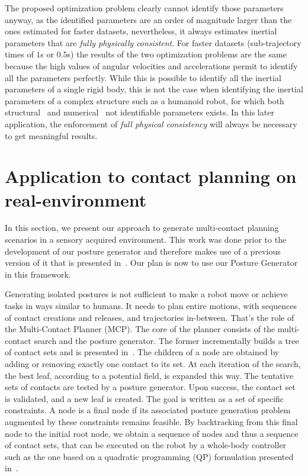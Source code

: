\FloatBarrier
The proposed optimization problem clearly cannot identify those parameters anyway, as the identified parameters are an order of magnitude larger than the ones estimated for faster datasets, nevertheless, it always estimates inertial parameters that are \emph{fully physically consistent}.
For faster datasets (sub-trajectory times of $1$s or $0.5$s) the results of the two optimization problems are the same because the high values of angular velocities and accelerations permit to identify all the parameters perfectly.
While this is possible to identify all the inertial parameters of a single rigid body, this is not the case when identifying the inertial parameters of a complex structure such as a humanoid robot, for which both structural~\cite{ayusawa2014identifiability} and numerical~\cite{pham1991essential} not identifiable parameters exists. In this later application, the enforcement of \emph{full physical consistency}  will always be necessary to get meaningful results.

\section{Application to contact planning on real-environment}
\label{sec:application_of_contact_planning_on_real_environment}

In this section, we present our approach to generate multi-contact planning scenarios in a sensory acquired environment.
This work was done prior to the development of our posture generator and therefore makes use of a previous version of it that is presented in~\cite{bouyarmane:humanoids:2010}.
Our plan is now to use our Posture Generator in this framework.

Generating isolated postures is not sufficient to make a robot move or achieve tasks in ways similar to humans.
It needs to plan entire motions, with sequences of contact creations and releases, and trajectories in-between.
That's the role of the Multi-Contact Planner (MCP).
The core of the planner consists of the multi-contact search and the posture generator.
The former incrementally builds a tree of contact sets and is presented in~\cite{escande:ras:2013}.
The children of a node are obtained by adding or removing exactly one contact to its set.
At each iteration of the search, the best leaf, according to a potential field, is expanded this way.
The tentative sets of contacts are tested by a posture generator.
Upon success, the contact set is validated, and a new leaf is created.
The goal is written as a set of specific constraints.
A node is a final node if its associated posture generation problem augmented by these constraints remains feasible.
By backtracking from this final node to the initial root node, we obtain a sequence of nodes and thus a sequence of contact sets, that can be executed on the robot by a whole-body controller such as the one based on a quadratic programming (QP) formulation presented in~\cite{bouyarmane:iros:2011}.

